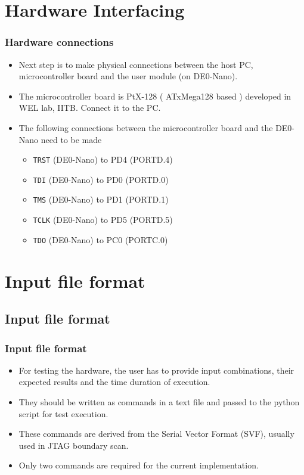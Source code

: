\documentclass{beamer}
\begin{document}
\section{Hardware Interfacing}
\begin{frame}
\frametitle{Hardware connections}

\begin{itemize}
\item Next step is to make physical connections between the host PC, microcontroller board and the user module (on DE0-Nano).
\item The microcontroller board is PtX-128 ( ATxMega128 based ) developed in WEL lab, IITB. Connect it to the PC.
\item The following connections between the microcontroller board and the DE0-Nano need to be made

\begin{itemize}
\item \texttt{TRST} (DE0-Nano) to PD4 (PORTD.4)
\item \texttt{TDI} (DE0-Nano) to PD0 (PORTD.0)
\item \texttt{TMS} (DE0-Nano) to PD1 (PORTD.1)
\item \texttt{TCLK} (DE0-Nano) to PD5 (PORTD.5)
\item \texttt{TDO} (DE0-Nano) to PC0 (PORTC.0)
\end{itemize}

\end{itemize}
\end{frame}
\section{Input file format}
\subsection{Input file format}
\begin{frame}
\frametitle{Input file format}

\begin{itemize}
\item For testing the hardware, the user has to provide input combinations, their expected results and the time duration of execution.
\item They should be written as commands in a text file and passed to the python script for test execution.
\item These commands are derived from the Serial Vector Format (SVF), usually used in JTAG boundary scan.
\item Only two commands are required for the current implementation.

\end{itemize}
\end{frame}
\end{document}
